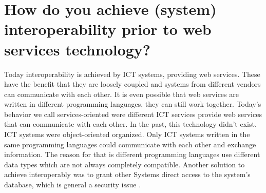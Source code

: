 \documentclass[conference,compsoc,onecolumn]{IEEEtran}
\begin{document}
    
  \section{How do you achieve (system) interoperability prior to web services technology?}
  
    Today interoperability is achieved by ICT systems, providing web services. These have the benefit that they are loosely coupled and systems from different vendors can communicate with each other.
    It is even possible that web services are written in different programming languages, they can still work together. 
    Today's behavior we  call services-oriented were different ICT services provide web services that can communicate with each other.
    In the past, this technology didn't exist. ICT systems were object-oriented organized.
    Only ICT systems written in the same programming languages could communicate with each other and exchange information. 
    The reason for that is different programming languages use different data types which are not always completely compatible.
    Another solution to achieve interoperably was to grant other Systems direct access to the system's database, which is general a security issue \cite{databasesecurity}. 

    
  \printbibliography[heading=bibintoc]  
    
\end{document}
